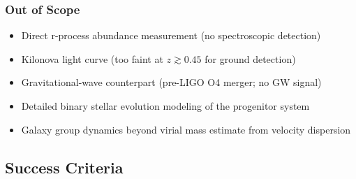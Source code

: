 \documentclass[11pt,letterpaper]{article}
\begin{document}
\subsubsection{Out of Scope}
\begin{itemize}[leftmargin=*]
  \item Direct r-process abundance measurement (no spectroscopic detection)
  \item Kilonova light curve (too faint at $z \gtrsim 0.45$ for ground detection)
  \item Gravitational-wave counterpart (pre-LIGO O4 merger; no GW signal)
  \item Detailed binary stellar evolution modeling of the progenitor system
  \item Galaxy group dynamics beyond virial mass estimate from velocity dispersion
\end{itemize}

\subsection{Success Criteria}
\end{document}
